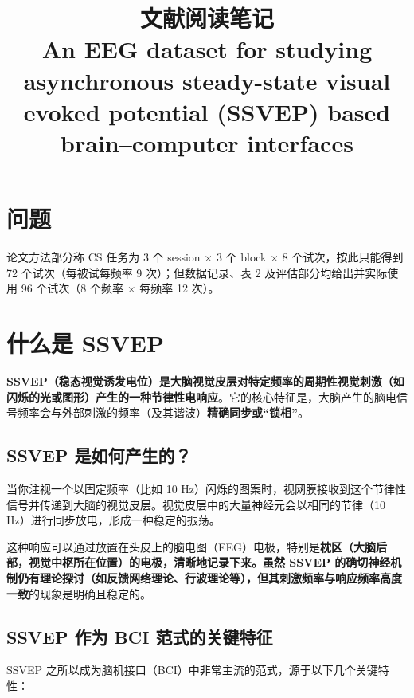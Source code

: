 \documentclass[12pt, a4paper]{ctexart}
\title{\textbf{文献阅读笔记}\\[0.3em]\large An EEG dataset for studying asynchronous steady-state visual evoked potential (SSVEP) based brain--computer interfaces}
\author{}
\date{}
\begin{document}
\maketitle
\tableofcontents
\newpage

\section{问题}

论文方法部分称 CS 任务为 3 个 session $\times$ 3 个 block $\times$ 8 个试次，按此只能得到 72 个试次（每被试每频率 9 次）；但数据记录、表 2 及评估部分均给出并实际使用 96 个试次（8 个频率 $\times$ 每频率 12 次）。

\section{什么是 SSVEP}

\textbf{SSVEP（稳态视觉诱发电位）是大脑视觉皮层对特定频率的周期性视觉刺激（如闪烁的光或图形）产生的一种节律性电响应}。它的核心特征是，大脑产生的脑电信号频率会与外部刺激的频率（及其谐波）\textbf{精确同步或``锁相''}。

\subsection{SSVEP 是如何产生的？}

当你注视一个以固定频率（比如 10 Hz）闪烁的图案时，视网膜接收到这个节律性信号并传递到大脑的视觉皮层。视觉皮层中的大量神经元会以相同的节律（10 Hz）进行同步放电，形成一种稳定的振荡。

这种响应可以通过放置在头皮上的脑电图（EEG）电极，特别是\textbf{枕区（大脑后部，视觉中枢所在位置）的电极，清晰地记录下来。虽然 SSVEP 的确切神经机制仍有理论探讨（如反馈网络理论、行波理论等），但其刺激频率与响应频率高度一致}的现象是明确且稳定的。

\subsection{SSVEP 作为 BCI 范式的关键特征}

SSVEP 之所以成为脑机接口（BCI）中非常主流的范式，源于以下几个关键特性：
\end{document}
